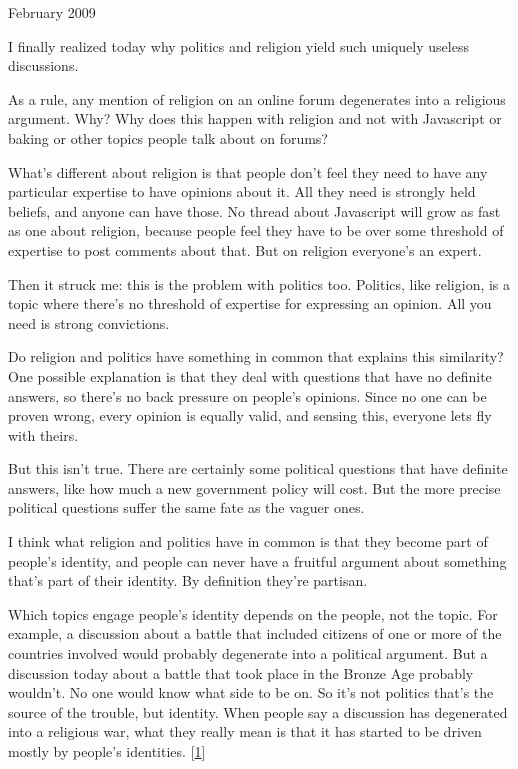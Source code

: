 February 2009

I finally realized today why politics and religion yield such uniquely
useless discussions.

As a rule, any mention of religion on an online forum degenerates into a
religious argument. Why? Why does this happen with religion and not with
Javascript or baking or other topics people talk about on forums?

What's different about religion is that people don't feel they need to
have any particular expertise to have opinions about it. All they need
is strongly held beliefs, and anyone can have those. No thread about
Javascript will grow as fast as one about religion, because people feel
they have to be over some threshold of expertise to post comments about
that. But on religion everyone's an expert.

Then it struck me: this is the problem with politics too. Politics, like
religion, is a topic where there's no threshold of expertise for
expressing an opinion. All you need is strong convictions.

Do religion and politics have something in common that explains this
similarity? One possible explanation is that they deal with questions
that have no definite answers, so there's no back pressure on people's
opinions. Since no one can be proven wrong, every opinion is equally
valid, and sensing this, everyone lets fly with theirs.

But this isn't true. There are certainly some political questions that
have definite answers, like how much a new government policy will cost.
But the more precise political questions suffer the same fate as the
vaguer ones.

I think what religion and politics have in common is that they become
part of people's identity, and people can never have a fruitful argument
about something that's part of their identity. By definition they're
partisan.

Which topics engage people's identity depends on the people, not the
topic. For example, a discussion about a battle that included citizens
of one or more of the countries involved would probably degenerate into
a political argument. But a discussion today about a battle that took
place in the Bronze Age probably wouldn't. No one would know what side
to be on. So it's not politics that's the source of the trouble, but
identity. When people say a discussion has degenerated into a religious
war, what they really mean is that it has started to be driven mostly by
people's identities. {[}\hyperref[f1n]{1}{]}


